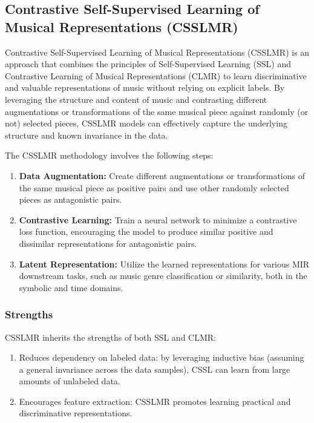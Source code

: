 \subsection{Contrastive Self-Supervised Learning of Musical Representations (CSSLMR)}

Contrastive Self-Supervised Learning of Musical Representations (CSSLMR) is an approach that combines the principles of Self-Supervised Learning (SSL) \cite{audioselfsupsurvey} and Contrastive Learning of Musical Representations (CLMR) \cite{CLMR2021} to learn discriminative and valuable representations of music without relying on explicit labels. By leveraging the structure and content of music and contrasting different augmentations or transformations of the same musical piece against randomly (or not) selected pieces, CSSLMR models can effectively capture the underlying structure and known invariance in the data.

The CSSLMR methodology involves the following steps:

\begin{enumerate}
\item \textbf{Data Augmentation:} Create different augmentations or transformations of the same musical piece as positive pairs and use other randomly selected pieces as antagonistic pairs.
\item \textbf{Contrastive Learning:} Train a neural network to minimize a contrastive loss function, encouraging the model to produce similar positive and dissimilar representations for antagonistic pairs.
\item\textbf{Latent Representation:} Utilize the learned representations for various MIR downstream tasks, such as music genre classification or similarity, both in the symbolic and time domains.
\end{enumerate} 

\subsubsection{Strengths}

CSSLMR inherits the strengths of both SSL and CLMR:

\begin{enumerate}
\item Reduces dependency on labeled data: by leveraging inductive bias (assuming a general invariance across the data samples), CSSL can learn from large amounts of unlabeled data.
\item Encourages feature extraction: CSSLMR promotes learning practical and discriminative representations.
\end{enumerate} 

